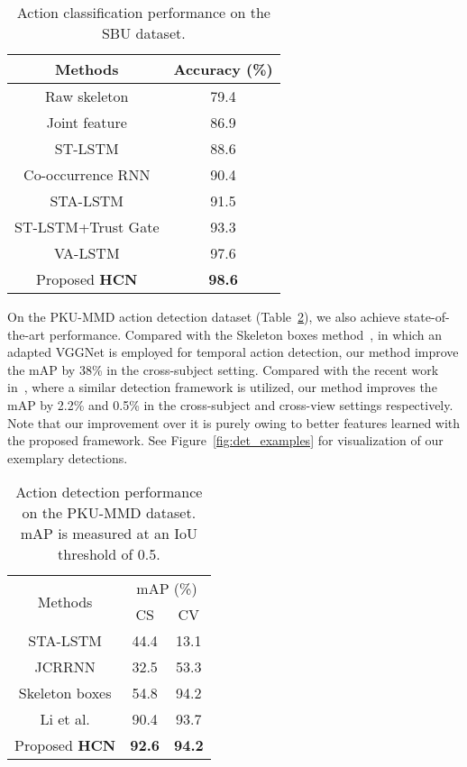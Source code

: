 \documentclass{article}
\begin{document}
\begin{table}[tbp]
  \centering
  \begin{tabular}{c|c}\hline
    Methods & Accuracy (\%) \\ \hline
    Raw skeleton \cite{Ji2014Interactive} &79.4 \\
    Joint feature \cite{Ji2014Interactive} &86.9 \\
    ST-LSTM \cite{trust_gate} &88.6 \\
    Co-occurrence RNN \cite{co_occurrence} &90.4 \\
    STA-LSTM \cite{song2016end} &91.5 \\
    ST-LSTM+Trust Gate \cite{trust_gate} &93.3 \\
    VA-LSTM \cite{view_adaptive} &97.6 \\
    Proposed \textbf{HCN}  & \textbf{98.6} \\
    \hline
  \end{tabular}
\caption{Action classification performance on the SBU dataset.}
  \label{table:SBU}
\end{table}

On the PKU-MMD action detection dataset (Table~\ref{table:PKU}), we also achieve state-of-the-art performance. Compared with the Skeleton boxes method~\cite{libo}, in which an adapted VGGNet is employed for temporal action detection, our method improve the mAP by 38\% in the cross-subject setting. Compared with the recent work in~\cite{Li_2017_ICMEW}, where a similar detection framework is utilized, our method improves the mAP by 2.2\% and 0.5\% in the cross-subject and cross-view settings respectively. Note that our improvement over it is purely owing to better features learned with the proposed framework. See Figure~\ref{fig:det_examples} for visualization of our exemplary detections.

\begin{table}[tbp]
  \centering
  \begin{tabular}{c|cc}\hline
    \multirow{2}{*}{Methods} & \multicolumn{2}{c}{mAP (\%)} \\
    & CS & CV \\ \hline
    STA-LSTM \cite{song2016end} &44.4 &13.1 \\
    JCRRNN \cite{li2016online} &32.5 &53.3 \\
    Skeleton boxes \cite{libo}  &54.8 &94.2 \\
    Li et al. \cite{Li_2017_ICMEW} &90.4 &93.7 \\
    Proposed \textbf{HCN}  &\textbf{92.6} &\textbf{94.2} \\
    \hline
  \end{tabular}
\caption{Action detection performance on the PKU-MMD dataset. mAP is measured at an IoU threshold of 0.5.}
  \label{table:PKU}
\end{table}
\end{document}
